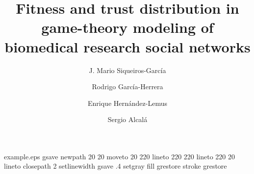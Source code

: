 %
%
%
%
%
\begin{filecontents*}{example.eps}
gsave
newpath
  20 20 moveto
  20 220 lineto
  220 220 lineto
  220 20 lineto
closepath
2 setlinewidth
gsave
  .4 setgray fill
grestore
stroke
grestore
\end{filecontents*}
%
\RequirePackage{fix-cm}
%
\documentclass[smallextended]{svjour3}       %
%
\smartqed  %
%
\usepackage{graphicx}
%
%
%
%
%


\title{Fitness and trust distribution in game-theory modeling of biomedical research social networks%
}


\author{J. Mario Siqueiros-Garc\'ia         \and      Rodrigo Garc\'ia-Herrera \and         Enrique Hern\'andez-Lemus \and
        Sergio Alcal\'a  %
}


